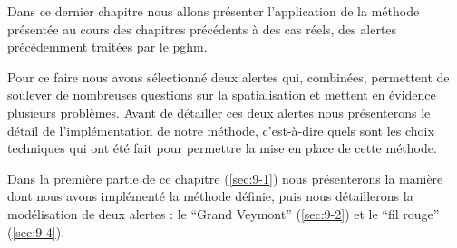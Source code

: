 Dans ce dernier chapitre nous allons présenter l'application de la
méthode présentée au cours des chapitres précédents à des cas réels,
des alertes précédemment traitées par le \ac{pghm}.

Pour ce faire nous avons sélectionné deux alertes qui, combinées,
permettent de soulever de nombreuses questions sur la spatialisation
et mettent en évidence plusieurs problèmes. Avant de détailler ces
deux alertes nous présenterons le détail de l'implémentation de notre
méthode, c'est-à-dire quels sont les choix techniques qui ont été fait
pour permettre la mise en place de cette méthode.

Dans la première partie de ce chapitre (\autoref{sec:9-1}) nous
présenterons la manière dont nous avons implémenté la méthode définie,
puis nous détaillerons la modélisation de deux alertes : le
\enquote{Grand Veymont} (\autoref{sec:9-2}) et le \enquote{fil rouge}
(\autoref{sec:9-4}).


